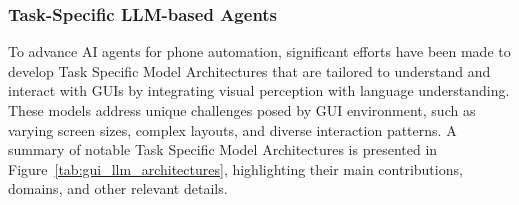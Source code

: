 \subsubsection{Task-Specific LLM-based Agents}
\label{subsubsec:task_specific_model_architectures}

To advance AI agents for phone automation, significant efforts have been made to develop Task Specific Model Architectures that are tailored to understand and interact with GUIs by integrating visual perception with language understanding. These models address unique challenges posed by GUI environment, such as varying screen sizes, complex layouts, and diverse interaction patterns. A summary of notable Task Specific Model Architectures is presented in Figure~\ref{tab:gui_llm_architectures}, highlighting their main contributions, domains, and other relevant details.


